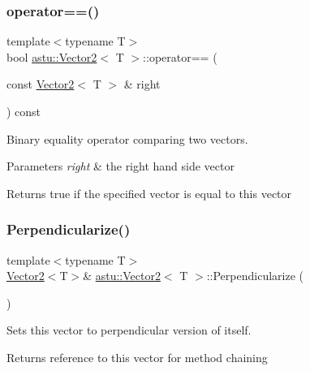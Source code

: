 \subsubsection{\texorpdfstring{operator==()}{operator==()}}
{\footnotesize\ttfamily template$<$typename T$>$ \\
bool \hyperlink{classastu_1_1Vector2}{astu\+::\+Vector2}$<$ T $>$\+::operator== (\begin{DoxyParamCaption}\item[{const \hyperlink{classastu_1_1Vector2}{Vector2}$<$ T $>$ \&}]{right }\end{DoxyParamCaption}) const\hspace{0.3cm}{\ttfamily [inline]}}

Binary equality operator comparing two vectors.


\begin{DoxyParams}{Parameters}
{\em right} & the right hand side vector \\
\hline
\end{DoxyParams}
\begin{DoxyReturn}{Returns}
{\ttfamily true} if the specified vector is equal to this vector 
\end{DoxyReturn}
\mbox{\label{classastu_1_1Vector2_ad5a274585f092f56875d0b9bccaa0df6}} 
\subsubsection{\texorpdfstring{Perpendicularize()}{Perpendicularize()}}
{\footnotesize\ttfamily template$<$typename T$>$ \\
\hyperlink{classastu_1_1Vector2}{Vector2}$<$T$>$\& \hyperlink{classastu_1_1Vector2}{astu\+::\+Vector2}$<$ T $>$\+::Perpendicularize (\begin{DoxyParamCaption}{ }\end{DoxyParamCaption})\hspace{0.3cm}{\ttfamily [inline]}}

Sets this vector to perpendicular version of itself.

\begin{DoxyReturn}{Returns}
reference to this vector for method chaining 
\end{DoxyReturn}
\mbox{\label{classastu_1_1Vector2_ac2b10a554fede91faa5a0668ebe76697}} 
